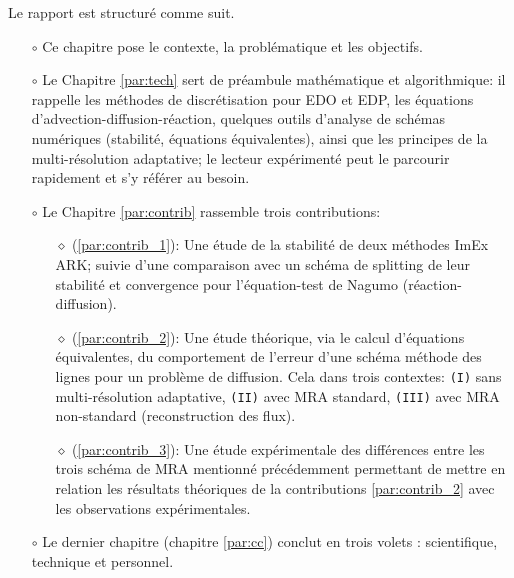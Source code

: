 Le rapport est structuré comme suit.
\begin{itemize}
\item[$\circ$] Ce chapitre pose le contexte, la problématique et les objectifs.
\item[$\circ$] Le Chapitre \ref{par:tech} sert de préambule mathématique et algorithmique:
il rappelle les méthodes de discrétisation pour EDO et EDP, les équations d'advection-diffusion-réaction, 
quelques outils d'analyse de schémas numériques (stabilité, équations équivalentes), ainsi que les principes de la multi-résolution adaptative; 
le lecteur expérimenté peut le parcourir rapidement et s'y référer au besoin.
\item[$\circ$] Le Chapitre \ref{par:contrib} rassemble trois contributions:
\begin{itemize}
    \item[$\diamond$] (\ref{par:contrib_1}): Une étude de la stabilité de deux méthodes ImEx ARK;
    suivie d'une comparaison avec un schéma de splitting de leur stabilité et convergence pour l'équation-test de Nagumo (réaction-diffusion).
    \item[$\diamond$] (\ref{par:contrib_2}): Une étude théorique, via le calcul d'équations équivalentes, 
    du comportement de l'erreur d'une schéma méthode des lignes pour un problème de diffusion. 
    Cela dans trois contextes: 
    \texttt{(I)} sans multi-résolution adaptative, 
    \texttt{(II)} avec MRA standard,
    \texttt{(III)} avec MRA non-standard (reconstruction des flux).
    \item[$\diamond$] (\ref{par:contrib_3}): Une étude expérimentale des différences entre les trois schéma de MRA mentionné précédemment 
    permettant de mettre en relation les résultats théoriques de la contributions \ref{par:contrib_2} avec les observations expérimentales.
\end{itemize}
\item[$\circ$] Le dernier chapitre (chapitre \ref{par:cc}) conclut en trois volets : scientifique, technique et personnel.
\end{itemize}